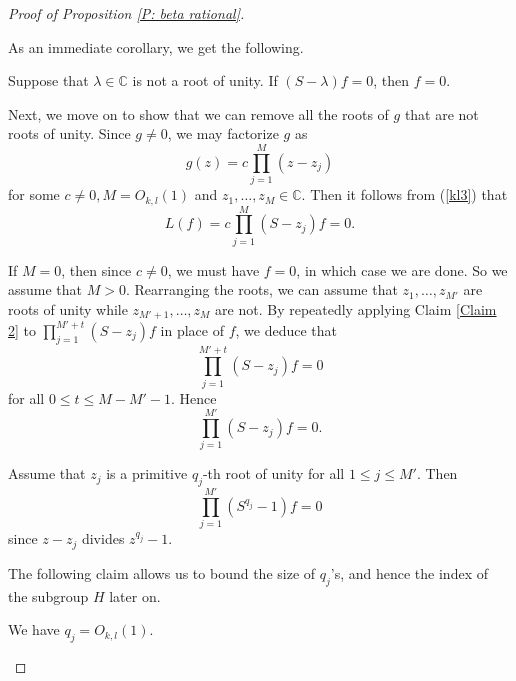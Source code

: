 \documentclass[10pt,a4paper]{amsart}
\begin{document}
\begin{proof}[Proof of Proposition \ref{P: beta rational}]
\

As an immediate corollary, we get the following.

\begin{claim}\label{Claim 2}
   Suppose that $\lambda\in\mathbb{C}$ is not a root of unity. If $(S-\lambda)f=0$, then $f=0$.
\end{claim}






 Next, we move on to show that we can remove all the roots of $g$ that are not roots of unity. Since $g\neq 0$, we may factorize $g$ as 
 $$g(z)=c\prod_{j=1}^{M}(z-z_{j})$$
 for some $c\neq 0, M=O_{k,l}(1)$ and $z_{1},\dots,z_{M}\in\mathbb{C}$. Then it follows from (\ref{kl3}) that
 $$L(f)=c\prod_{j=1}^{M}(S-z_{j})f=0.$$

If $M=0$, then since $c\neq 0$, we must have $f=0$, in which case we are done. So we assume that $M>0$. Rearranging the roots, we can assume that  $z_{1},\dots,z_{M'}$ are roots of unity while $z_{M'+1},\dots,z_{M}$ are not. By repeatedly applying Claim \ref{Claim 2} to $\prod_{j=1}^{M'+t}(S-z_{j})f$ in place of $f$, we deduce that
$$\prod_{j=1}^{M'+t}(S-z_{j})f=0$$
for all $0\leq t\leq M-M'-1$. Hence
 $$\prod_{j=1}^{M'}(S-z_{j})f=0.$$
 
 Assume that $z_j$ is a primitive $q_j$-th root of unity for all $1\leq j\leq M'$.
Then  
\begin{equation}\label{kl5}
    \prod_{j=1}^{M'}(S^{q_{j}}-1)f=0
\end{equation}
since $z-z_{j}$ divides $z^{q_{j}}-1$.

The following claim allows us to bound the size of $q_j$'s, and hence the index of the subgroup $H$ later on.
\begin{claim}\label{Claim 3}
    We have $q_{j}=O_{k,l}(1)$.
\end{claim}
 

\end{proof}
\end{document}
